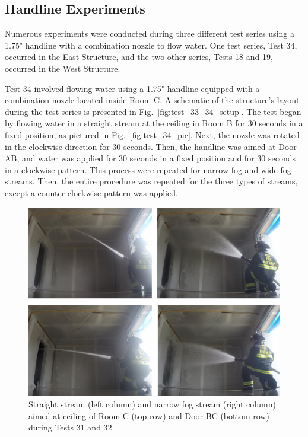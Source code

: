 \documentclass[12pt,oneside]{book}
\begin{document}
\clearpage

\subsection{Handline Experiments}
\label{sec:Water_Flow_Handline_Procedure}
Numerous experiments were conducted during three different test series using a 1.75" handline with a combination nozzle to flow water. One test series, Test 34, occurred in the East Structure, and the two other series, Tests 18 and 19, occurred in the West Structure. 

Test 34 involved flowing water using a 1.75" handline equipped with a combination nozzle located inside Room C. A schematic of the structure's layout during the test series is presented in Fig.~\ref{fig:test_33_34_setup}. The test began by flowing water in a straight stream at the ceiling in Room B for 30 seconds in a fixed position, as pictured in Fig.~\ref{fig:test_34_pic}. Next, the nozzle was rotated in the clockwise direction for 30 seconds. Then, the handline was aimed at Door AB, and water was applied for 30 seconds in a fixed position and for 30 seconds in a clockwise pattern. This process were repeated for narrow fog and wide fog streams. Then, the entire procedure was repeated for the three types of streams, except a counter-clockwise pattern was applied.

\begin{figure}[!ht]
\includegraphics[width=6in]{../Pictures/East_handline_C_BC.pdf}
\caption[Straight Stream and Narrow Fog Stream during Tests 31 and 32]{Straight stream (left column) and narrow fog stream (right column) aimed at ceiling of Room C (top row) and Door BC (bottom row) during Tests 31 and 32}
\label{fig:test_31_32_pic}
\end{figure}
\end{document}
